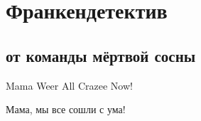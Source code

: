 \section*{Франкендетектив} %
\subsection*{от команды мёртвой сосны}
\begin{epigraph}
    Mama Weer All Crazee Now!
\end{epigraph}
\begin{epigraph}
    Мама, мы все сошли с ума!
\end{epigraph}
